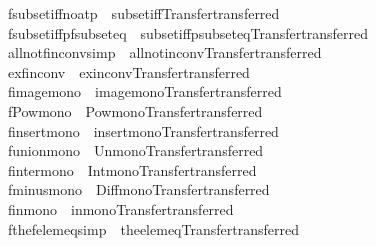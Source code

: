 \begin{isabellebody}
\isamarkupfalse%
\ fsubset{\isacharunderscore}iff{\isacharbrackleft}no{\isacharunderscore}atp{\isacharbrackright}\ {\isacharequal}\ subset{\isacharunderscore}iff{\isacharbrackleft}Transfer{\isachardot}transferred{\isacharbrackright}\isanewline
{}\isamarkupfalse%
\ fsubset{\isacharunderscore}iff{\isacharunderscore}pfsubset{\isacharunderscore}eq\ {\isacharequal}\ subset{\isacharunderscore}iff{\isacharunderscore}psubset{\isacharunderscore}eq{\isacharbrackleft}Transfer{\isachardot}transferred{\isacharbrackright}\isanewline
{}\isamarkupfalse%
\ all{\isacharunderscore}not{\isacharunderscore}fin{\isacharunderscore}conv{\isacharbrackleft}simp{\isacharbrackright}\ {\isacharequal}\ all{\isacharunderscore}not{\isacharunderscore}in{\isacharunderscore}conv{\isacharbrackleft}Transfer{\isachardot}transferred{\isacharbrackright}\isanewline
{}\isamarkupfalse%
\ ex{\isacharunderscore}fin{\isacharunderscore}conv\ {\isacharequal}\ ex{\isacharunderscore}in{\isacharunderscore}conv{\isacharbrackleft}Transfer{\isachardot}transferred{\isacharbrackright}\isanewline
{}\isamarkupfalse%
\ fimage{\isacharunderscore}mono\ {\isacharequal}\ image{\isacharunderscore}mono{\isacharbrackleft}Transfer{\isachardot}transferred{\isacharbrackright}\isanewline
{}\isamarkupfalse%
\ fPow{\isacharunderscore}mono\ {\isacharequal}\ Pow{\isacharunderscore}mono{\isacharbrackleft}Transfer{\isachardot}transferred{\isacharbrackright}\isanewline
{}\isamarkupfalse%
\ finsert{\isacharunderscore}mono\ {\isacharequal}\ insert{\isacharunderscore}mono{\isacharbrackleft}Transfer{\isachardot}transferred{\isacharbrackright}\isanewline
{}\isamarkupfalse%
\ funion{\isacharunderscore}mono\ {\isacharequal}\ Un{\isacharunderscore}mono{\isacharbrackleft}Transfer{\isachardot}transferred{\isacharbrackright}\isanewline
{}\isamarkupfalse%
\ finter{\isacharunderscore}mono\ {\isacharequal}\ Int{\isacharunderscore}mono{\isacharbrackleft}Transfer{\isachardot}transferred{\isacharbrackright}\isanewline
{}\isamarkupfalse%
\ fminus{\isacharunderscore}mono\ {\isacharequal}\ Diff{\isacharunderscore}mono{\isacharbrackleft}Transfer{\isachardot}transferred{\isacharbrackright}\isanewline
{}\isamarkupfalse%
\ fin{\isacharunderscore}mono\ {\isacharequal}\ in{\isacharunderscore}mono{\isacharbrackleft}Transfer{\isachardot}transferred{\isacharbrackright}\isanewline
{}\isamarkupfalse%
\ fthe{\isacharunderscore}felem{\isacharunderscore}eq{\isacharbrackleft}simp{\isacharbrackright}\ {\isacharequal}\ the{\isacharunderscore}elem{\isacharunderscore}eq{\isacharbrackleft}Transfer{\isachardot}transferred{\isacharbrackright}\isanewline

\end{isabellebody}
